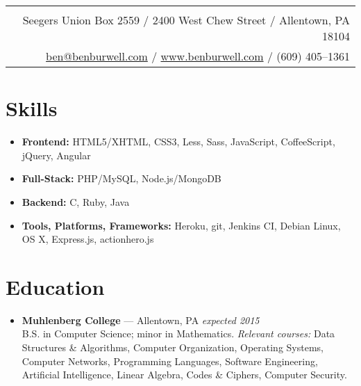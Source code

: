 \documentclass[11pt]{article}
\begin{document}
\thispagestyle{empty}

\noindent\begin{tabularx}{\textwidth}{|N|}
   \\
  Seegers Union Box 2559 / 2400 West Chew Street / Allentown, PA 18104 \\
  \href{mailto:ben@benburwell.com}{ben@benburwell.com} / \href{https://www.benburwell.com/}{www.benburwell.com} / (609) 405--1361 \\
  \hline
\end{tabularx}



\section*{Skills}
\begin{itemize}
  \item \textbf{Frontend:} HTML5/XHTML, CSS3, Less, Sass, JavaScript, CoffeeScript, jQuery, Angular
  \item \textbf{Full-Stack:} PHP/MySQL, Node.js/MongoDB
  \item \textbf{Backend:} C, Ruby, Java
  \item \textbf{Tools, Platforms, Frameworks:} Heroku, git, Jenkins CI, Debian Linux, OS X, Express.js, actionhero.js
\end{itemize}



\section*{Education}
\begin{itemize}
  \item \textbf{Muhlenberg College} --- Allentown, PA \hfill {\em expected 2015} \\
    B.S. in Computer Science; minor in Mathematics. {\em Relevant courses:} Data Structures \& Algorithms, Computer Organization, Operating Systems, Computer Networks, Programming Languages, Software Engineering, Artificial Intelligence, Linear Algebra, Codes \& Ciphers, Computer Security.
\end{itemize}
\end{document}
